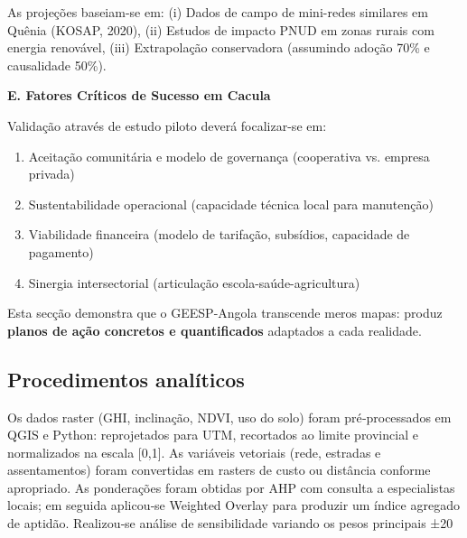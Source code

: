 \documentclass[12pt, a4paper]{article}
\begin{document}
As projeções baseiam-se em: (i) Dados de campo de mini-redes similares em Quênia 
(KOSAP, 2020), (ii) Estudos de impacto PNUD em zonas rurais com energia renovável, 
(iii) Extrapolação conservadora (assumindo adoção 70\% e causalidade 50\%).

\textbf{E. Fatores Críticos de Sucesso em Cacula}

Validação através de estudo piloto deverá focalizar-se em:
\begin{enumerate}
\item Aceitação comunitária e modelo de governança (cooperativa vs. empresa privada)
\item Sustentabilidade operacional (capacidade técnica local para manutenção)
\item Viabilidade financeira (modelo de tarifação, subsídios, capacidade de pagamento)
\item Sinergia intersectorial (articulação escola-saúde-agricultura)
\end{enumerate}

Esta secção demonstra que o GEESP-Angola transcende meros mapas: produz 
\textbf{planos de ação concretos e quantificados} adaptados a cada realidade.

\subsection{Procedimentos analíticos}

Os dados raster (GHI, inclinação, NDVI, uso do solo) foram pré‑processados em QGIS e Python: reprojetados para UTM, recortados ao limite provincial e normalizados na escala [0,1]. As variáveis vetoriais (rede, estradas e assentamentos) foram convertidas em rasters de custo ou distância conforme apropriado. As ponderações foram obtidas por AHP com consulta a especialistas locais; em seguida aplicou‑se Weighted Overlay para produzir um índice agregado de aptidão. Realizou‑se análise de sensibilidade variando os pesos principais ±20%
\end{document}
